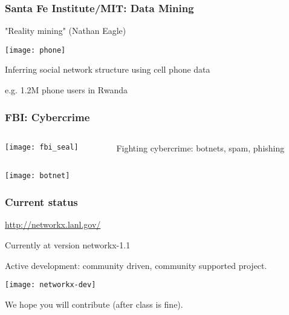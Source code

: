 \documentclass[xcolor=dvipsnames, 9pt]{beamer}
\begin{document}
\begin{frame}
\frametitle{Santa Fe Institute/MIT: Data Mining}
\begin{center}
"Reality mining" (Nathan Eagle)

\centerline{\texttt{[image: phone]}}

Inferring social network structure using cell phone data 

e.g. 1.2M phone users in Rwanda
\end{center}

\end{frame}

\begin{frame}
\frametitle{FBI: Cybercrime}
\begin{columns}[c]
\begin{column}{0.1\textwidth}
\centerline{\texttt{[image: fbi\_seal]}}
\end{column}
\begin{column}{0.9\textwidth}
Fighting cybercrime: botnets, spam, phishing
\end{column}
\end{columns}

\centerline{\texttt{[image: botnet]}}


\end{frame}


\begin{frame}
\frametitle{Current status}

{\Large \url{http://networkx.lanl.gov/}}
\bigskip

Currently at version networkx-1.1

Active development: community driven, community supported project.

\centerline{\texttt{[image: networkx-dev]}}


We hope you will contribute (after class is fine).

\end{frame}
\end{document}
